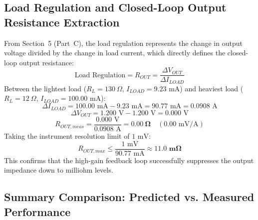 \documentclass[11pt,a4paper]{article}
\begin{document}
\subsection{Load Regulation and Closed-Loop Output Resistance Extraction}
From Section~5 (Part~C), the load regulation represents the change in output voltage divided by the change in load current, which directly defines the closed-loop output resistance:
\begin{equation}
    \text{Load Regulation} = R_{OUT} = \frac{\Delta V_{OUT}}{\Delta I_{LOAD}}
\end{equation}
Between the lightest load ($R_L = 130\ \Omega$, $I_{LOAD} = 9.23\text{ mA}$) and heaviest load ($R_L = 12\ \Omega$, $I_{LOAD} = 100.00\text{ mA}$):
\begin{equation}
    \Delta I_{LOAD} = 100.00\text{ mA} - 9.23\text{ mA} = 90.77\text{ mA} = 0.0908\text{ A}
\end{equation}
\begin{equation}
    \Delta V_{OUT} = 1.200\text{ V} - 1.200\text{ V} = 0.000\text{ V}
\end{equation}
\begin{equation}
    R_{OUT,meas} = \frac{0.000\text{ V}}{0.0908\text{ A}} = \mathbf{0.00\ \Omega} \quad (0.00\text{ mV/A})
\end{equation}
Taking the instrument resolution limit of $1\text{ mV}$:
\begin{equation}
    R_{OUT,max} \le \frac{1\text{ mV}}{90.77\text{ mA}} \approx \mathbf{11.0\text{ m}\Omega}
\end{equation}
This confirms that the high-gain feedback loop successfully suppresses the output impedance down to milliohm levels.

\subsection{Summary Comparison: Predicted vs. Measured Performance}
\end{document}
